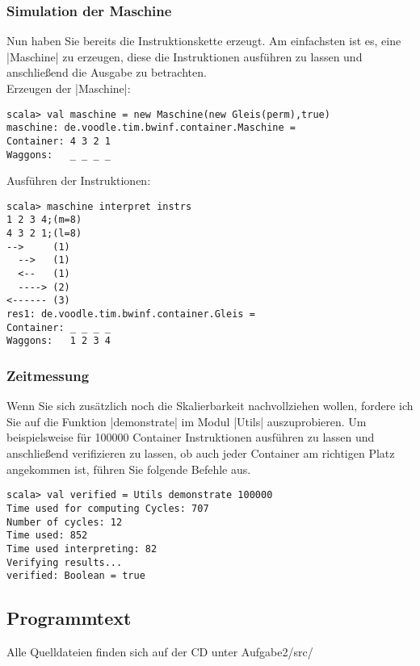\subsubsection{Simulation der Maschine}
Nun haben Sie bereits die Instruktionskette erzeugt.
Am einfachsten ist es, eine |Maschine| zu erzeugen, diese die Instruktionen ausführen zu lassen und anschließend die Ausgabe zu betrachten. \\
Erzeugen der |Maschine|:
\begin{lstlisting}
scala> val maschine = new Maschine(new Gleis(perm),true)
maschine: de.voodle.tim.bwinf.container.Maschine = 
Container: 4 3 2 1
Waggons:   _ _ _ _
\end{lstlisting}
Ausführen der Instruktionen:
\begin{lstlisting}
scala> maschine interpret instrs
1 2 3 4;(m=8)
4 3 2 1;(l=8)
-->     (1)
  -->   (1)
  <--   (1)
  ----> (2)
<------ (3)
res1: de.voodle.tim.bwinf.container.Gleis = 
Container: _ _ _ _
Waggons:   1 2 3 4
\end{lstlisting}
\subsubsection{Zeitmessung}
Wenn Sie sich zusätzlich noch die Skalierbarkeit nachvollziehen wollen, fordere ich Sie auf die Funktion |demonstrate| im Modul |Utils| auszuprobieren.
Um beispielsweise für 100000 Container Instruktionen ausführen zu lassen und anschließend verifizieren zu lassen, ob auch jeder Container am richtigen Platz angekommen ist, führen Sie folgende Befehle aus.
\begin{lstlisting}
scala> val verified = Utils demonstrate 100000 
Time used for computing Cycles: 707
Number of cycles: 12
Time used: 852
Time used interpreting: 82
Verifying results...
verified: Boolean = true
\end{lstlisting}

\newpage
\subsection{Programmtext}
Alle Quelldateien finden sich auf der CD unter Aufgabe2/src/
